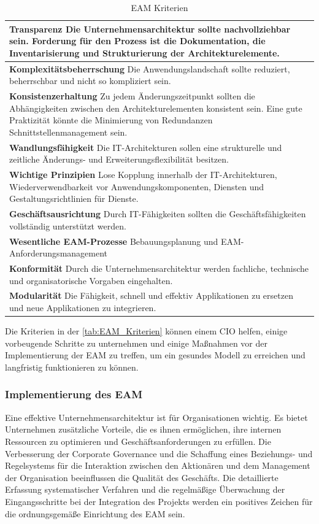 \documentclass[doc]{apa6}
\begin{document}
\begin{table}[!h]
\caption{EAM Kriterien}
\begin{center}
\begin{tabularx}{\textwidth}{|X|}
\hline
\textbf{Transparenz}
Die Unternehmensarchitektur sollte nachvollziehbar sein.
Forderung für den Prozess ist die Dokumentation, die Inventarisierung und Strukturierung der Architekturelemente.
\\\hline
\textbf{Komplexitätsbeherrschung}
Die Anwendungslandschaft sollte reduziert, beherrschbar und nicht so kompliziert sein.
\\\hline
\textbf{Konsistenzerhaltung}
Zu jedem Änderungszeitpunkt sollten die Abhängigkeiten zwischen den Architekturelementen konsistent sein.
Eine gute Praktizität könnte die Minimierung von Redundanzen Schnittstellenmanagement sein. 
\\\hline
\textbf{Wandlungsfähigkeit}
Die IT-Architekturen sollen eine strukturelle und zeitliche Änderungs- und Erweiterungsflexibilität besitzen. 
\\\hline
\textbf{Wichtige Prinzipien}
Lose Kopplung innerhalb der IT-Architekturen, Wiederverwendbarkeit vor Anwendungskomponenten, Diensten und Gestaltungsrichtlinien für Dienste.
\\\hline
\textbf{Geschäftsausrichtung}
Durch IT-Fähigkeiten sollten die Geschäftsfähigkeiten vollständig unterstützt werden.
\\\hline
\textbf{Wesentliche EAM-Prozesse}
Bebauungsplanung und EAM-Anforderungsmanagement
\\\hline
\textbf{Konformität}
Durch die Unternehmensarchitektur werden fachliche, technische und organisatorische Vorgaben eingehalten.
\\\hline
\textbf{Modularität}
Die Fähigkeit, schnell und effektiv Applikationen zu ersetzen und neue Applikationen zu integrieren.
\\\hline
\end{tabularx}
\end{center}
\label{tab:EAM_Kriterien}
\end{table}

Die Kriterien in der \autoref{tab:EAM_Kriterien} können einem CIO helfen, einige vorbeugende Schritte zu unternehmen und einige Maßnahmen vor der Implementierung der EAM zu treffen, um ein gesundes Modell zu erreichen und langfristig funktionieren zu können.

\subsubsection{Implementierung des EAM}
Eine effektive Unternehmensarchitektur ist für Organisationen wichtig. Es bietet Unternehmen zusätzliche Vorteile, die es ihnen ermöglichen, ihre internen Ressourcen zu optimieren und Geschäftsanforderungen zu erfüllen. Die Verbesserung der Corporate Governance und die Schaffung eines Beziehungs- und Regelsystems für die Interaktion zwischen den Aktionären und dem Management der Organisation beeinflussen die Qualität des Geschäfts. Die detaillierte Erfassung systematischer Verfahren und die regelmäßige Überwachung der Eingangsschritte bei der Integration des Projekts werden ein positives Zeichen für die ordnungsgemäße Einrichtung des EAM sein.
\end{document}
